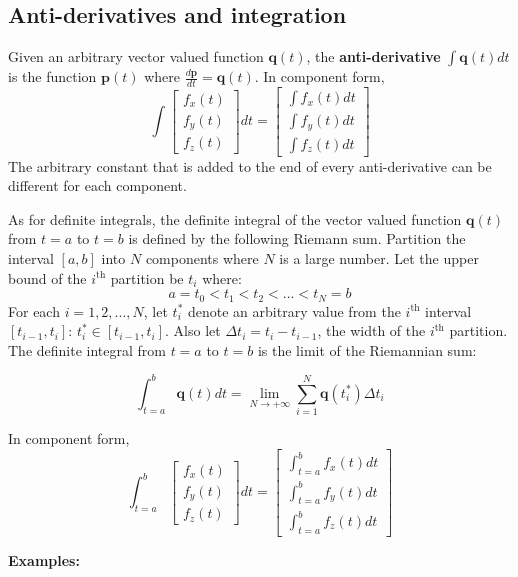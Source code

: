\documentclass{article}
\begin{document}
\subsection*{Anti-derivatives and integration}

Given an arbitrary vector valued function \(\mathbf{q}(t)\), the {\bf anti-derivative} \(\int \mathbf{q}(t)dt\) is the function \(\mathbf{p}(t)\) where \(\frac{d\mathbf{p}}{dt} = \mathbf{q}(t)\). In component form, 
\[\int\begin{bmatrix} f_x(t) \\ f_y(t) \\ f_z(t) \end{bmatrix}dt = \begin{bmatrix} \int f_x(t)dt \\ \int f_y(t)dt \\ \int f_z(t)dt \end{bmatrix}\]
The arbitrary constant that is added to the end of every anti-derivative can be different for each component.

As for definite integrals, the definite integral of the vector valued function \(\mathbf{q}(t)\) from \(t = a\) to \(t = b\) is defined by the following Riemann sum. Partition the interval \([a, b]\) into \(N\) components where \(N\) is a large number. Let the upper bound of the \(i^{\text{th}}\) partition be \(t_i\) where:
\[a = t_0 < t_1 < t_2 < ... < t_N = b\]
For each \(i = 1, 2, ..., N\), let \(t_i^*\) denote an arbitrary value from the \(i^{\text{th}}\) interval \([t_{i-1}, t_i]\): \(t_i^* \in [t_{i-1}, t_i]\). Also let \(\Delta t_i = t_i - t_{i-1}\), the width of the \(i^{\text{th}}\) partition. The definite integral from \(t = a\) to \(t = b\) is the limit of the Riemannian sum:

\[\int_{t = a}^b \mathbf{q}(t)dt = \lim_{N \to +\infty} \sum_{i = 1}^N \mathbf{q}(t_i^*)\Delta t_i\]

In component form,
\[\int_{t = a}^b \begin{bmatrix} f_x(t) \\ f_y(t) \\ f_z(t) \end{bmatrix}dt = \begin{bmatrix} \int_{t = a}^b f_x(t)dt \\ \int_{t = a}^b f_y(t)dt \\ \int_{t = a}^b f_z(t)dt \end{bmatrix}\]

\textbf{Examples:}
\end{document}
